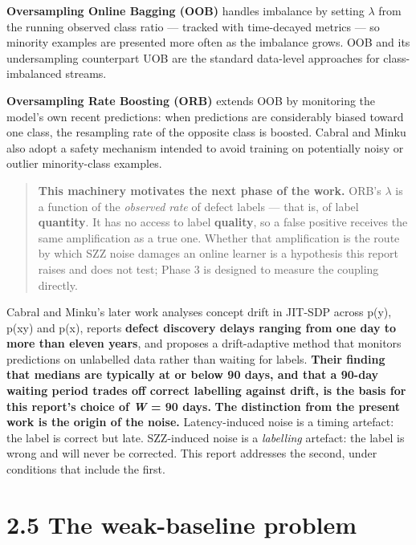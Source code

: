 \textbf{Oversampling Online Bagging (OOB)} \citep{wang2015oob} handles
imbalance by setting \ensuremath{\lambda} from the running observed class ratio --- tracked
with time-decayed metrics --- so minority examples are presented more
often as the imbalance grows. OOB and its undersampling counterpart UOB
are the standard data-level approaches for class-imbalanced streams.

\textbf{Oversampling Rate Boosting (ORB)} extends OOB by monitoring the
model's own recent predictions: when predictions are considerably biased
toward one class, the resampling rate of the opposite class is boosted.
Cabral and Minku also adopt a safety mechanism intended to avoid
training on potentially noisy or outlier minority-class examples.

\begin{quote}
\textbf{This machinery motivates the next phase of the work.} ORB's \ensuremath{\lambda} is
a function of the \emph{observed rate} of defect labels --- that is, of
label \textbf{quantity}. It has no access to label \textbf{quality}, so
a false positive receives the same amplification as a true one. Whether
that amplification is the route by which SZZ noise damages an online
learner is a hypothesis this report raises and does not test; Phase 3 is
designed to measure the coupling directly.
\end{quote}

Cabral and Minku's later work \citep{cabral2023reliable} analyses
concept drift in JIT-SDP across p(y), p(x\textbar y) and p(x), reports
\textbf{defect discovery delays ranging from one day to more than eleven
years}, and proposes a drift-adaptive method that monitors predictions
on unlabelled data rather than waiting for labels. \textbf{Their finding
that medians are typically at or below 90 days, and that a 90-day
waiting period trades off correct labelling against drift, is the basis
for this report's choice of \emph{W} = 90 days.} \textbf{The distinction
from the present work is the origin of the noise.} Latency-induced noise
is a timing artefact: the label is correct but late. SZZ-induced noise
is a \emph{labelling} artefact: the label is wrong and will never be
corrected. This report addresses the second, under conditions that
include the first.

\section{2.5 The weak-baseline problem}\label{the-weak-baseline-problem}

